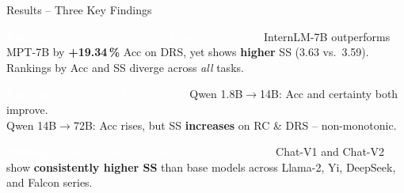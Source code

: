 \documentclass{beamer}
\begin{document}
\begin{frame}{Results -- Three Key Findings}

\begin{block}{\textcolor{white}{\textbf{Finding 1:} Higher Accuracy $\neq$ Lower Uncertainty}}
  InternLM-7B outperforms MPT-7B by \textbf{+19.34\,\%} Acc on DRS,
  yet shows \textbf{higher} SS (3.63 vs.\ 3.59).
  Rankings by Acc and SS diverge across \emph{all} tasks.
\end{block}

\medskip

\begin{block}{\textcolor{white}{\textbf{Finding 2:} Larger $\neq$ More Certain}}
  Qwen 1.8B$\to$14B: Acc and certainty both improve.\\
  Qwen 14B$\to$72B: Acc rises, but SS \textbf{increases} on RC \& DRS -- non-monotonic.
\end{block}

\medskip

\begin{block}{\textcolor{white}{\textbf{Finding 3:} Instruction Finetuning Raises Uncertainty}}
  Chat-V1 and Chat-V2 show \textbf{consistently higher SS} than base models
  across Llama-2, Yi, DeepSeek, and Falcon series.
\end{block}

\end{frame}
\end{document}
